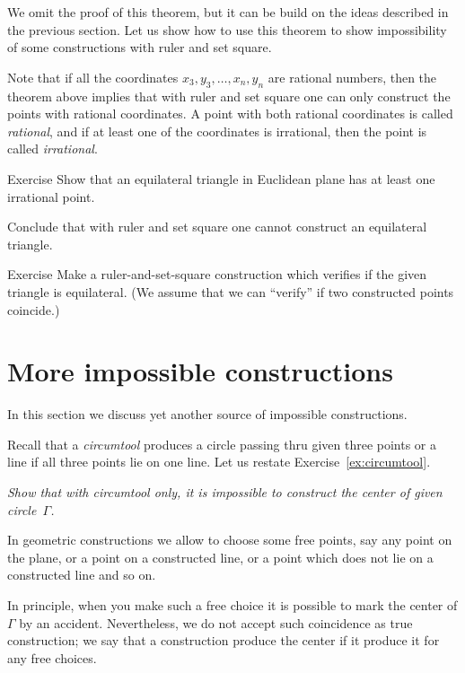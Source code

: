 We omit the proof of this theorem, but it can be build on the ideas described in the previous section. 
Let us show how to use this theorem to show impossibility of some constructions with ruler and set square.

Note that if all the coordinates $x_3,y_3,\dots,x_n,y_n$ are rational numbers, then the theorem above implies that with ruler and set square one can only construct the points with rational coordinates.
A point with both rational coordinates is called \emph{rational},
and if at least one of the coordinates is irrational, then the point is called \emph{irrational}.

\begin{thm}{Exercise}\label{ex:equilateral triangle}
Show that an equilateral triangle in Euclidean plane has at least one irrational point.

Conclude that with ruler and set square one cannot construct an equilateral triangle.
\end{thm}


\begin{thm}{Exercise}\label{ex:equilateral triangle-verify}
Make a ruler-and-set-square construction which verifies if the given triangle is  equilateral.
(We assume that we can ``verify'' if two constructed points coincide.) 
\end{thm}


\section*{More impossible constructions}

In this section we discuss yet another source of impossible constructions. 

Recall that a \emph{circumtool} produces a circle passing thru given three points
or a line if all three points lie on one line.
Let us restate Exercise~\ref{ex:circumtool}.

\textit{Show that with circumtool only,
it is impossible to construct the center of given circle~$\Gamma$.}
\medskip

In geometric constructions we allow to choose some free points,
say any point on the plane, or a point on a constructed line, or a point which does not lie on a constructed line and so on.

In principle, when you make such a free choice it is possible to mark the center of $\Gamma$ by an accident.
Nevertheless, we do not accept such coincidence as true construction; 
we say that a construction produce the center if it produce it for any free choices.


